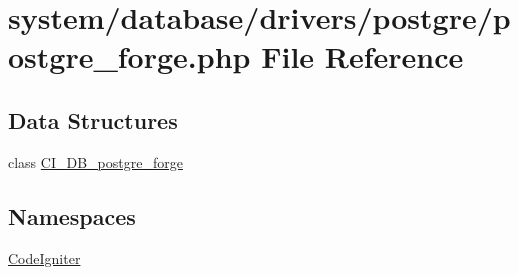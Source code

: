\hypertarget{postgre__forge_8php}{}\section{system/database/drivers/postgre/postgre\+\_\+forge.php File Reference}
\label{postgre__forge_8php}
\subsection*{Data Structures}
\begin{DoxyCompactItemize}
\item 
class \mbox{\hyperlink{class_c_i___d_b__postgre__forge}{C\+I\+\_\+\+D\+B\+\_\+postgre\+\_\+forge}}
\end{DoxyCompactItemize}
\subsection*{Namespaces}
\begin{DoxyCompactItemize}
\item 
 \mbox{\hyperlink{namespace_code_igniter}{Code\+Igniter}}
\end{DoxyCompactItemize}
